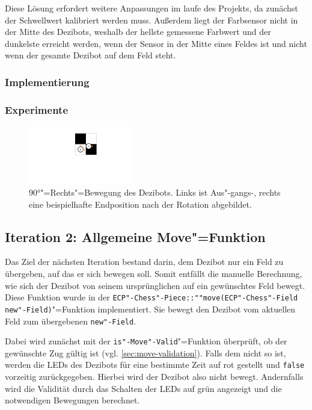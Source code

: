 Diese Lösung erfordert weitere Anpassungen im laufe des Projekts, da zunächst der Schwellwert kalibriert werden muss. Außerdem liegt der Farbsensor nicht in der Mitte des Dezibots, weshalb der hellste gemessene Farbwert und der dunkelste erreicht werden, wenn der Sensor in der Mitte eines Feldes ist und nicht wenn der gesamte Dezibot auf dem Feld steht.


\subsubsection{Implementierung}


\subsubsection{Experimente}

\begin{figure}[h]
    \centering
    \includegraphics[width=0.4\textwidth]{../assets/dezibot_rotation_position_offset.pdf}
    \caption{90°"=Rechts"=Bewegung des Dezibots. Links ist Aus"-gangs-, rechts eine beispielhafte Endposition nach der Rotation abgebildet.}
    \label{fig:dezibot-rotation-position-offset}
\end{figure}


\subsection{Iteration 2: Allgemeine Move"=Funktion}
\label{sec:general-move-function}

Das Ziel der nächsten Iteration bestand darin, dem Dezibot nur ein Feld zu übergeben, auf das er sich bewegen soll. Somit entfällt die manuelle Berechnung, wie sich der Dezibot von seinem ursprünglichen auf ein gewünschtes Feld bewegt. Diese Funktion wurde in der \texttt{ECP"-Chess"-Piece::""move(ECP"-Chess"-Field new"-Field)}"=Funktion implementiert. Sie bewegt den Dezibot vom aktuellen Feld zum übergebenen \texttt{new"-Field}.

Dabei wird zunächst mit der \texttt{is"-Move"-Valid}"=Funktion überprüft, ob der gewünschte Zug gültig ist (vgl. \autoref{sec:move-validation}). Falls dem nicht so ist, werden die LEDs des Dezibots für eine bestimmte Zeit auf rot gestellt und \texttt{false} vorzeitig zurückgegeben. Hierbei wird der Dezibot also nicht bewegt. Andernfalls wird die Validität durch das Schalten der LEDs auf grün angezeigt und die notwendigen Bewegungen berechnet.

